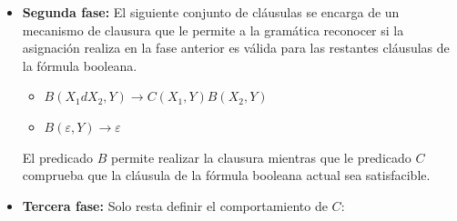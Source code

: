 \begin{itemize}
    \item \textbf{Segunda fase:} El siguiente conjunto de cláusulas se encarga de un mecanismo de clausura que le permite a la gramática
          reconocer si la asignación realiza en la fase anterior es válida para las restantes cláusulas de la fórmula
          booleana.
          \begin{itemize}
              \item $B(X_1dX_2,Y)\to C(X_1,Y) B(X_2,Y)$
              \item $B(\varepsilon,Y)\to\varepsilon$
          \end{itemize}
          
          El predicado $B$ permite realizar la clausura mientras que le predicado $C$ comprueba que la cláusula de la fórmula
          booleana actual sea satisfacible.
          
    \item \textbf{Tercera fase:} Solo resta definir el comportamiento de $C$:
          \begin{itemize}
          \end{itemize}
          

\end{itemize}

